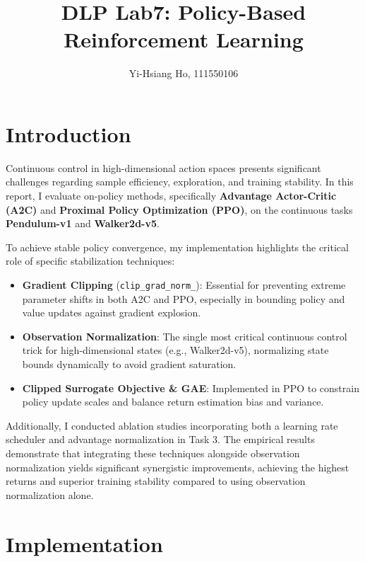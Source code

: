 \documentclass[10pt,twocolumn,letterpaper]{article}
\begin{document}
\title{DLP Lab7: Policy-Based Reinforcement Learning}

\author{Yi-Hsiang Ho, 111550106
}
\maketitle


\section{Introduction}
\label{sec:intro}

Continuous control in high-dimensional action spaces presents significant
challenges regarding sample efficiency, exploration, and training stability.
In this report, I evaluate on-policy methods, specifically \textbf{Advantage
  Actor-Critic (A2C)} and \textbf{Proximal Policy Optimization (PPO)}, on the
continuous tasks \textbf{Pendulum-v1} and \textbf{Walker2d-v5}.

To achieve stable policy convergence, my implementation highlights the
critical role of specific stabilization techniques:
\begin{itemize}[itemsep=-3pt]
  \item \textbf{Gradient Clipping} (\verb|clip_grad_norm_|): Essential
        for preventing extreme parameter shifts in both A2C and PPO, especially in
        bounding policy and value updates against gradient explosion.
  \item \textbf{Observation Normalization}: The single most critical continuous
        control trick for high-dimensional states (e.g., Walker2d-v5), normalizing
        state bounds dynamically to avoid gradient saturation.
  \item \textbf{Clipped Surrogate Objective \& GAE}: Implemented in PPO to
        constrain policy update scales and balance return estimation bias and
        variance.
\end{itemize}

Additionally, I conducted ablation studies incorporating both a learning rate
scheduler and advantage normalization in Task 3. The empirical results
demonstrate that integrating these techniques alongside observation normalization 
yields significant synergistic improvements, achieving the highest returns 
and superior training stability compared to using observation normalization alone.

\section{Implementation}
\label{sec:implementation}
\end{document}
